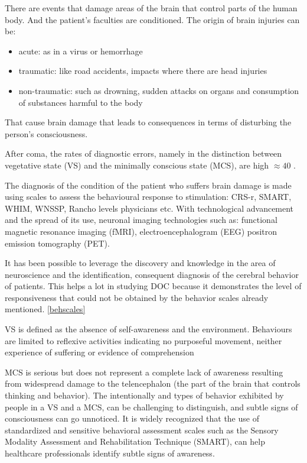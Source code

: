There are events that damage areas of the brain that control parts of the human body. And the patient's faculties are conditioned.
The origin of brain injuries can be: 
\begin{itemize}
    \item acute: as in a virus or hemorrhage  \item traumatic: like road accidents, impacts where there are head injuries  \item non-traumatic: such as drowning, sudden attacks on organs and consumption of substances harmful to the body
\end{itemize} 
That cause brain damage that leads to consequences in terms of disturbing the person's consciousness\cite{teixeira2020disorders}.

After coma, the rates of diagnostic errors, namely in the distinction between vegetative state (VS) and the minimally conscious state (MCS), are high  $\approx 40$ \cite{andrews1996misdiagnosis}  \cite{ gill2004sensory} \cite{schnakers2009diagnostic}. 

The diagnosis of the condition of the patient who suffers brain damage is made using scales to assess the behavioural response to stimulation:
CRS-r, SMART, WHIM, WNSSP, Rancho levels physicians etc. \label{behscales}
With technological advancement and the spread of its use, neuronal imaging technologies such as:
   functional magnetic resonance imaging (fMRI),
   electroencephalogram (EEG)
   positron emission tomography (PET).

  It has been possible to leverage the discovery and knowledge in the area of neuroscience and the identification, consequent diagnosis of the cerebral behavior of patients. This helps a lot in studying %
  DOC because it demonstrates the level of responsiveness that could not be obtained by the behavior scales already mentioned. \ref{behscales}
  
  VS is defined as the absence of self-awareness and the environment. Behaviours are limited to reflexive activities indicating no purposeful movement, neither experience of suffering or evidence of comprehension \citet{multi1994medical}
  
  MCS is serious but does not represent a complete lack of awareness resulting  from widespread damage to the telencephalon (the part of the brain that controls thinking and behavior).
  The intentionally and types of behavior exhibited by people in a VS and a MCS,
 can be challenging to distinguish, and subtle signs of consciousness can go unnoticed.
It is widely recognized that the use of standardized and sensitive behavioral assessment scales
such as the Sensory Modality Assessment and Rehabilitation Technique (SMART), can
help healthcare professionals identify subtle signs of awareness.



